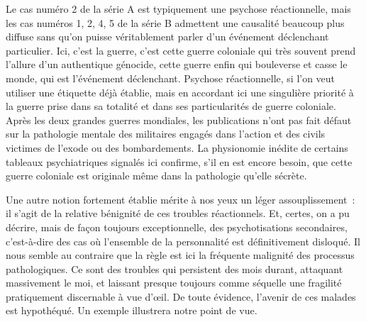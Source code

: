 \documentclass[french,twoside]{book} %
\begin{document}
Le cas numéro 2 de la série A est typiquement une psychose réactionnelle, mais les cas numéros 1, 2, 4, 5 de la série B admettent une causalité beaucoup plus diffuse sans qu’on puisse véritablement parler d’un événement déclenchant particulier. Ici, c’est la guerre, c’est cette guerre coloniale qui très souvent prend l’allure d’un authentique génocide, cette guerre enfin qui   bouleverse et casse le monde, qui est l’événement déclenchant. Psychose réactionnelle, si l’on veut utiliser une étiquette déjà établie, mais en accordant ici une singulière priorité à la guerre prise dans sa totalité et dans ses particularités de guerre coloniale. Après les deux grandes guerres mondiales, les publications n’ont pas fait défaut sur la pathologie mentale des militaires engagés dans l’action et des civils victimes de l’exode ou des bombardements. La physionomie inédite de certains tableaux psychiatriques signalés ici confirme, s’il en est encore besoin, que cette guerre coloniale est originale même dans la pathologie qu’elle sécrète.\par
Une autre notion fortement établie mérite à nos yeux un léger assouplissement : il s’agit de la relative bénignité de ces troubles réactionnels. Et, certes, on a pu décrire, mais de façon toujours exceptionnelle, des psychotisations secondaires, c’est-à-dire des cas où l’ensemble de la personnalité est définitivement disloqué. Il nous semble au contraire que la règle est ici la fréquente malignité des processus pathologiques. Ce sont des troubles qui persistent des mois durant, attaquant massivement le moi, et laissant presque toujours comme séquelle une fragilité pratiquement discernable à vue d’œil. De toute évidence, l’avenir de ces malades est hypothéqué. Un exemple illustrera notre point de vue.\par
\end{document}
